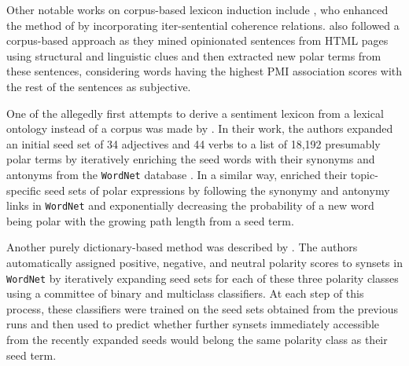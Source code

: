 Other notable works on corpus-based lexicon induction include
\citet{Kanayama:06}, who enhanced the method of
\citeauthor{Hatzivassi:97} by incorporating iter-sentential coherence
relations.  \citet{Kaji:07} also followed a corpus-based approach as
they mined opinionated sentences from HTML pages using structural and
linguistic clues and then extracted new polar terms from these
sentences, considering words having the highest PMI association scores
with the rest of the sentences as subjective.

One of the allegedly first attempts to derive a sentiment lexicon from
a lexical ontology instead of a corpus was made by \citet{Kim:04}.  In
their work, the authors expanded an initial seed set of 34 adjectives
and 44 verbs to a list of 18,192 presumably polar terms by iteratively
enriching the seed words with their synonyms and antonyms from the
\texttt{WordNet} database \citep{Miller:95}. In a similar way,
\citet{Godbole:07} enriched their topic-specific seed sets of polar
expressions by following the synonymy and antonymy links in
\texttt{WordNet} and exponentially decreasing the probability of a new
word being polar with the growing path length from a seed term.




Another purely dictionary-based method was described by
\citet{Esuli:06b}.  The authors automatically assigned positive,
negative, and neutral polarity scores to synsets in \texttt{WordNet}
by iteratively expanding seed sets for each of these three polarity
classes using a committee of binary and multiclass classifiers.  At
each step of this process, these classifiers were trained on the seed
sets obtained from the previous runs and then used to predict whether
further synsets immediately accessible from the recently expanded
seeds would belong the same polarity class as their seed term.

